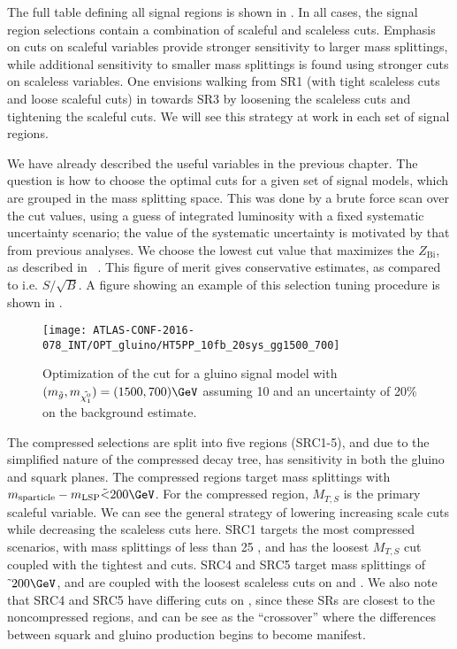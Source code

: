 The full table defining all signal regions is shown in .
In all cases, the signal region selections contain a combination of scaleful and scaleless cuts.
Emphasis on cuts on scaleful variables provide stronger sensitivity to larger mass splittings, while additional sensitivity to smaller mass splittings is found using stronger cuts on scaleless variables.
One envisions walking from SR1 (with tight scaleless cuts and loose scaleful cuts) in  towards SR3 by loosening the scaleless cuts and tightening the scaleful cuts.
We will see this strategy at work in each set of signal regions.

We have already described the useful variables in the previous chapter.
The question is how to choose the optimal cuts for a given set of signal models, which are grouped in the mass splitting space.
This was done by a brute force scan over the cut values, using a guess of integrated luminosity with a fixed systematic uncertainty scenario; the value of the systematic uncertainty is motivated by that from previous analyses.
We choose the lowest cut value that maximizes the $Z_{\text{Bi}}$, as described in ~\cite{Cousins:2008zz}.
This figure of merit gives conservative estimates, as compared to i.e. $S/\sqrt{B}$.
A figure showing an example of this selection tuning procedure is shown in .

\begin{figure}
\caption{Optimization of the  cut for a gluino signal model with $(m_{\gluino}, m_{\lsp} ) = (1500,700) \GeV $ assuming 10 \ifb and an uncertainty of 20\% on the background estimate.
} \label{fig:sr_optimization}
\texttt{[image: ATLAS-CONF-2016-078\_INT/OPT\_gluino/HT5PP\_10fb\_20sys\_gg1500\_700]}
\end{figure}

The compressed selections are split into five regions (SRC1-5), and due to the simplified nature of the compressed decay tree, has sensitivity in both the gluino and squark planes.
The compressed regions target mass splittings with $m_{\text{sparticle}} - m_{\text{LSP}} \tilde{<} 200 \GeV$.
For the compressed region, $M_{T, S}$ is the primary scaleful variable.
We can see the general strategy of lowering increasing scale cuts while decreasing the scaleless cuts here.
SRC1 targets the most compressed scenarios, with mass splittings of less than 25 \GeV, and has the loosest $M_{T, S}$ cut coupled with the tightest \risr and \dphiISR cuts.
SRC4 and SRC5 target mass splittings of $\tilde{~} 200 \GeV$, and are coupled with the loosest scaleless cuts on \risr and \dphiISR.
We also note that SRC4 and SRC5 have differing cuts on \NVjet, since these SRs are closest to the noncompressed regions, and can be see as the ``crossover'' where the differences between squark and gluino production begins to become manifest.


